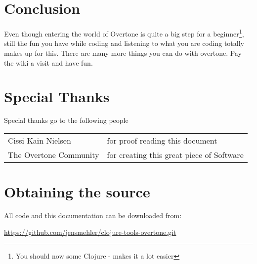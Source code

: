 \chapter{Conclusion}
\label{chap:end}
Even though entering the world of Overtone is quite a big step for a beginner\footnote{You should now some Clojure - makes it a lot easier}, still the fun you have while coding and listening to what you are coding totally makes up for this.
There are many more things you can do with overtone. Pay the wiki\cite{ow} a visit and have fun.

\chapter{Special Thanks}
Special thanks go to the following people

\begin{tabular}{l l}
Cissi Kain Nielsen & for proof reading this document\\
The Overtone Community & for creating this great piece of Software\\
\end{tabular}

\chapter{Obtaining the source}
All code and this documentation can be downloaded from:

\url{https://github.com/jensmehler/clojure-tools-overtone.git}

